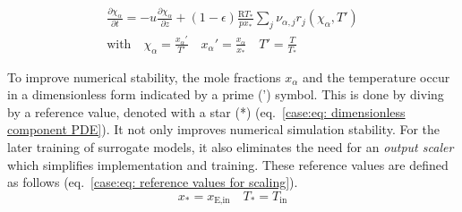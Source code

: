 \begin{equation}
    \label{case:eq: dimensionless component PDE}
    \begin{gathered}
        \frac{\partial \chi_\alpha}{\partial t} = - u \frac{\partial \chi_\alpha}{\partial z}
        + (1 - \epsilon) \frac{\mathrm{R} T_*}{p x_*} \sum_j \nu_{\alpha,j} r_j(\chi_\alpha, T') \\
        \text{with} \quad \chi_\alpha = \frac{x_\alpha'}{T'} \quad 
        x_\alpha' = \frac{x_\alpha}{x_*} \quad
        T' = \frac{T}{T_*}
    \end{gathered}
\end{equation}

\noindent
To improve numerical stability, the mole fractions $x_\alpha$ and the temperature occur in a dimensionless
form indicated by a prime (') symbol. This is done by diving by a reference value, denoted with a star
(*) (eq.~\ref{case:eq: dimensionless component PDE}).
It not only improves numerical simulation stability. For the later training of surrogate models, it also eliminates the need for
an \emph{output scaler} which simplifies implementation and training. These reference values are defined as follows (eq.~\ref{case:eq: reference values for scaling}).
\begin{equation}
    \label{case:eq: reference values for scaling}
    x_* = x_\text{E,in} \quad T_* = T_\text{in}
\end{equation}

